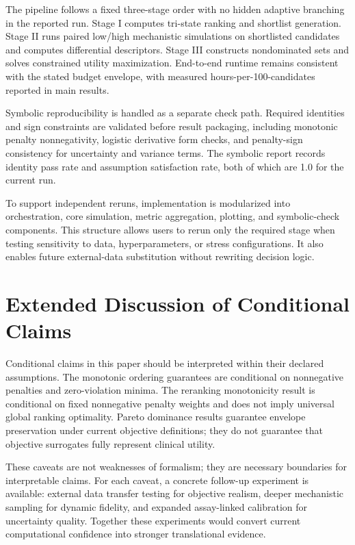 \documentclass{article} %
\begin{document}
The pipeline follows a fixed three-stage order with no hidden adaptive branching in the reported run. Stage I computes tri-state ranking and shortlist generation. Stage II runs paired low/high mechanistic simulations on shortlisted candidates and computes differential descriptors. Stage III constructs nondominated sets and solves constrained utility maximization. End-to-end runtime remains consistent with the stated budget envelope, with measured hours-per-100-candidates reported in main results.

Symbolic reproducibility is handled as a separate check path. Required identities and sign constraints are validated before result packaging, including monotonic penalty nonnegativity, logistic derivative form checks, and penalty-sign consistency for uncertainty and variance terms. The symbolic report records identity pass rate and assumption satisfaction rate, both of which are 1.0 for the current run.

To support independent reruns, implementation is modularized into orchestration, core simulation, metric aggregation, plotting, and symbolic-check components. This structure allows users to rerun only the required stage when testing sensitivity to data, hyperparameters, or stress configurations. It also enables future external-data substitution without rewriting decision logic.

\section{Extended Discussion of Conditional Claims}
\label{sec:appendix_claims}
Conditional claims in this paper should be interpreted within their declared assumptions. The monotonic ordering guarantees are conditional on nonnegative penalties and zero-violation minima. The reranking monotonicity result is conditional on fixed nonnegative penalty weights and does not imply universal global ranking optimality. Pareto dominance results guarantee envelope preservation under current objective definitions; they do not guarantee that objective surrogates fully represent clinical utility.

These caveats are not weaknesses of formalism; they are necessary boundaries for interpretable claims. For each caveat, a concrete follow-up experiment is available: external data transfer testing for objective realism, deeper mechanistic sampling for dynamic fidelity, and expanded assay-linked calibration for uncertainty quality. Together these experiments would convert current computational confidence into stronger translational evidence.
\end{document}
